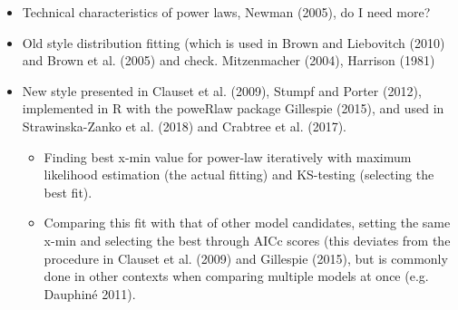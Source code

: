 \documentclass[
  12pt,
]{book}
\begin{document}
\begin{itemize}
\item
  Technical characteristics of power laws, Newman (2005), do I need more?
\item
  Old style distribution fitting (which is used in Brown and Liebovitch (2010) and Brown et al. (2005) and check. Mitzenmacher (2004), Harrison (1981)
\item
  New style presented in Clauset et al. (2009), Stumpf and Porter (2012), implemented in R with the poweRlaw package Gillespie (2015), and used in Strawinska-Zanko et al. (2018) and Crabtree et al. (2017).

  \begin{itemize}
  \item
    Finding best x-min value for power-law iteratively with maximum likelihood estimation (the actual fitting) and KS-testing (selecting the best fit).
  \item
    Comparing this fit with that of other model candidates, setting the same x-min and selecting the best through AICc scores (this deviates from the procedure in Clauset et al. (2009) and Gillespie (2015), but is commonly done in other contexts when comparing multiple models at once (e.g. Dauphiné 2011).
  \end{itemize}
\end{itemize}
\end{document}
